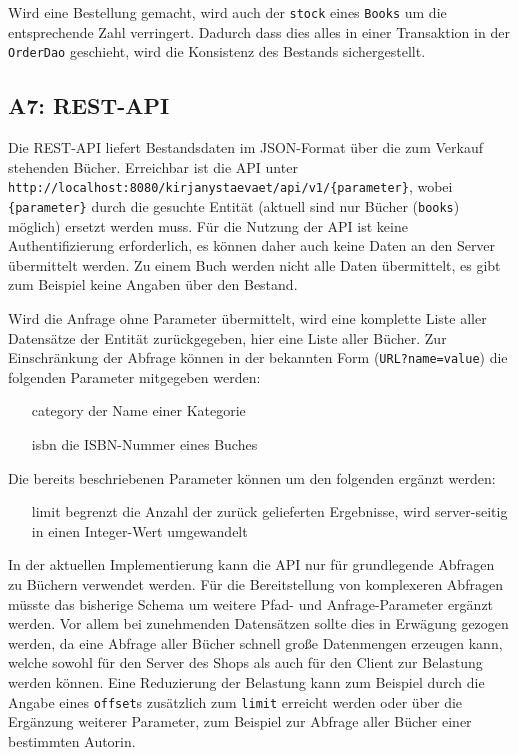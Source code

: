 	Wird eine Bestellung gemacht, wird auch der \texttt{stock} eines \texttt{Books} um die entsprechende Zahl verringert. Dadurch dass dies alles in einer Transaktion in der \texttt{OrderDao} geschieht, wird die Konsistenz des Bestands sichergestellt.
	
	
	\subsection{A7: REST-API}\label{sec:umsetzung:API}
	Die REST-API liefert Bestandsdaten im JSON-Format über die zum Verkauf stehenden Bücher. Erreichbar ist die API unter \lstinline|http://localhost:8080/kirjanystaevaet/api/v1/{parameter}|, wobei \lstinline|{parameter}| durch die gesuchte Entität (aktuell sind nur Bücher (\lstinline|books|) möglich) ersetzt werden muss. Für die Nutzung der API ist keine Authentifizierung erforderlich, es können daher auch keine Daten an den Server übermittelt werden. Zu einem Buch werden nicht alle Daten übermittelt, es gibt zum Beispiel keine Angaben über den Bestand.
	
	Wird die Anfrage ohne Parameter übermittelt, wird eine komplette Liste aller Datensätze der Entität zurückgegeben, hier eine Liste aller Bücher. Zur Einschränkung der Abfrage können in der bekannten Form (\lstinline|URL?name=value|) die folgenden Parameter mitgegeben werden:
	\begin{itemize}
		\item[category] der Name einer Kategorie
		\item[isbn] die ISBN-Nummer eines Buches
	\end{itemize}
	
	Die bereits beschriebenen Parameter können um den folgenden ergänzt werden:
	\begin{itemize}
		\item[limit] begrenzt die Anzahl der zurück gelieferten Ergebnisse, wird server-seitig in einen Integer-Wert umgewandelt
	\end{itemize}
	
	In der aktuellen Implementierung kann die API nur für grundlegende Abfragen zu Büchern verwendet werden. Für die Bereitstellung von komplexeren Abfragen müsste das bisherige Schema um weitere Pfad- und Anfrage-Parameter ergänzt werden. Vor allem bei zunehmenden Datensätzen sollte dies in Erwägung gezogen werden, da eine Abfrage aller Bücher schnell große Datenmengen erzeugen kann, welche sowohl für den Server des Shops als auch für den Client zur Belastung werden können. Eine Reduzierung der Belastung kann zum Beispiel durch die Angabe eines \lstinline|offset|s zusätzlich zum \lstinline|limit| erreicht werden oder über die Ergänzung weiterer Parameter, zum Beispiel zur Abfrage aller Bücher einer bestimmten Autorin.
	
